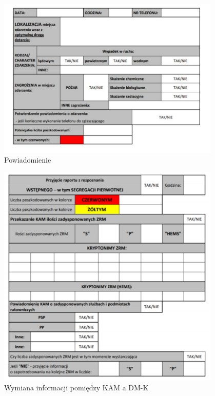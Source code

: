 \begin{figure}[h!]
  \centering
    \includegraphics[width=0.95\textwidth]{img/powiadomienia.png}
  \caption{Powiadomienie} 
  \label{fig:org}                                       
\end{figure}

\begin{figure}[h!]
  \centering
    \includegraphics[width=0.95\textwidth]{img/Kamtodmk.png}
  \caption{Wymiana informacji pomiędzy KAM a DM-K} 
  \label{fig:org}                                       
\end{figure}

